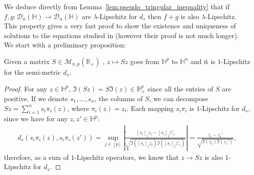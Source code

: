 \documentclass[a4papaer, titlepage]{book}
\begin{document}

We deduce directly from Lemma~\ref{lem:pseudo_tringular_inequality} that if $f,g : \mathcal D_n(\mathbb H) \to \mathcal D_n(\mathbb H)$ are $\lambda$-Lipschitz for $d_s$ then $f+g$ is also $\lambda$-Lipschitz.
This property gives a very fast proof to show the existence and uniqueness of solutions to the equations studied in \cite{AJA16} (however their proof is not much longer).  We start with a preliminary proposition:
\begin{proposition}\label{pro:produit_avec_S_1_lipschitz_pour_d_s}
  Given a matrix $S \in \mathcal M_{n,p}(\mathbb R_+)$ , $z \mapsto Sz$ goes from $\mathbb H^p$ to $\mathbb H^n$ and it is $1$-Lipschitz for the semi-metric $d_s$.
\end{proposition}
\begin{proof}
  For any $z \in \mathbb H^p$, $\Im(Sz) = S \Im(z) \in \mathbb R^p_+$ since all the entries of $S$ are positive. If we denote $s_1,\ldots, s_n$, the columns of $S$, we can decompose $Sz = \sum_{i=1}^n s_i \pi_i(z)$, where $\pi_i(z) = z_i$.
  Each mapping $s_i \pi_i$ is $1$-Lipschitz for $d_s$, since we have for any $z,z' \in \mathbb H^p$:
  \begin{align*}
    d_s(s_i\pi_i(z), s_i \pi_i(z')) = \sup_{j\in[p]} \left\vert \frac{[s_i]_j z_i - [s_i]_j z'_i}{\sqrt{\Im([s_i]_j z_i)\Im([s_i]_j z'_i)}}\right\vert =  \frac{ z_i -  z_i'}{\sqrt{\Im( z_i)\Im( z_i')}},
  \end{align*}
  therefore, as a sum of $1$-Lipschitz operators, we know that $z \to Sz$ is also $1$-Lipschitz for $d_s$.
\end{proof}

\end{document}
